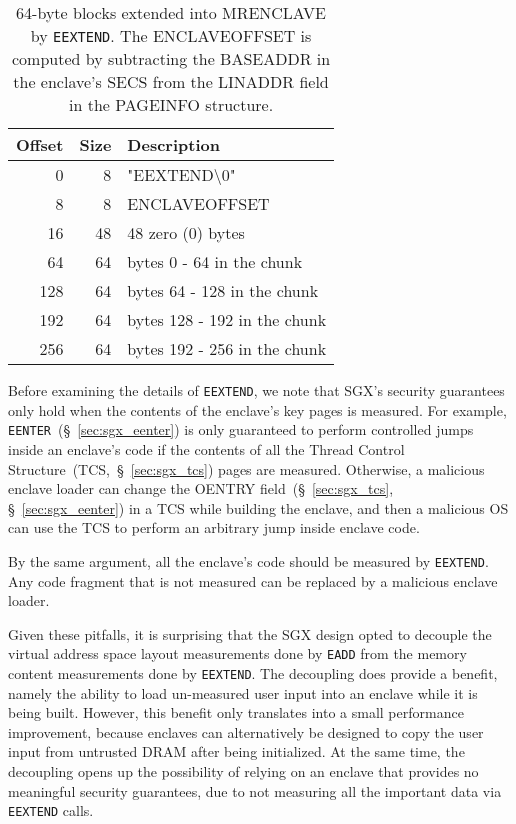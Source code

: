 \begin{table}[hbt]
  \centering
  \begin{tabularx}{\columnwidth}{| r | r | X |}
  \hline
  \textbf{Offset} & \textbf{Size} & \textbf{Description}\\
  \hline
  0 & 8 & "EEXTEND\textbackslash{}0" \\
  \hline
  8 & 8 & ENCLAVEOFFSET \\
  \hline
  16 & 48 & 48 zero (0) bytes \\
  \hline
  \hline
  64 & 64 & bytes 0 - 64 in the chunk \\
  \hline
  \hline
  128 & 64 & bytes 64 - 128 in the chunk \\
  \hline
  \hline
  192 & 64 & bytes 128 - 192 in the chunk \\
  \hline
  \hline
  256 & 64 & bytes 192 - 256 in the chunk \\
  \hline
  \end{tabularx}
  \caption{
    64-byte blocks extended into MRENCLAVE by \texttt{EEXTEND}. The
    ENCLAVEOFFSET is computed by subtracting the BASEADDR in the enclave's SECS
    from the LINADDR field in the PAGEINFO structure.
  }
  \label{fig:eextend_mrenclave}
\end{table}

Before examining the details of \texttt{EEXTEND}, we note that SGX's security
guarantees only hold when the contents of the enclave's key pages is measured.
For example, \texttt{EENTER}~(\S~\ref{sec:sgx_eenter}) is only guaranteed to
perform controlled jumps inside an enclave's code if the contents of all the
Thread Control Structure~(TCS,~\S~\ref{sec:sgx_tcs}) pages are measured.
Otherwise, a malicious enclave loader can change the OENTRY
field~(\S~\ref{sec:sgx_tcs}, \S~\ref{sec:sgx_eenter}) in a TCS while building
the enclave, and then a malicious OS can use the TCS to perform an arbitrary
jump inside enclave code.

By the same argument, all the enclave's code should be measured by
\texttt{EEXTEND}. Any code fragment that is not measured can be replaced by a
malicious enclave loader.

Given these pitfalls, it is surprising that the SGX design opted to decouple
the virtual address space layout measurements done by \texttt{EADD} from the
memory content measurements done by \texttt{EEXTEND}. The decoupling does
provide a benefit, namely the ability to load un-measured user input into an
enclave while it is being built. However, this benefit only translates into a
small performance improvement, because enclaves can alternatively be designed
to copy the user input from untrusted DRAM after being initialized. At the same
time, the decoupling opens up the possibility of relying on an enclave that
provides no meaningful security guarantees, due to not measuring all the
important data via \texttt{EEXTEND} calls.


